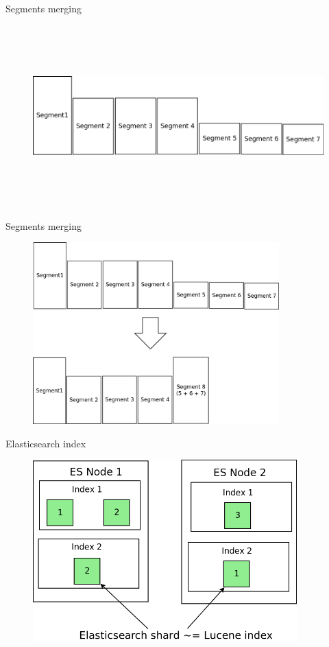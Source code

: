 \documentclass{beamer}
\begin{document}
\begin{frame}{Segments merging}
	\begin{figure}
		\includegraphics[width=\textwidth,height=7cm,keepaspectratio=true]{segments}
	\end{figure}
\end{frame}
\begin{frame}{Segments merging}
	\begin{figure}
		\includegraphics[width=\textwidth,height=7cm,keepaspectratio=true]{segments-merging}
	\end{figure}
\end{frame}
\begin{frame}{Elasticsearch index}
	\begin{figure}
		\includegraphics[width=\textwidth,height=7cm,keepaspectratio=true]{elasticsearch-index}
	\end{figure}
\end{frame}
\end{document}
